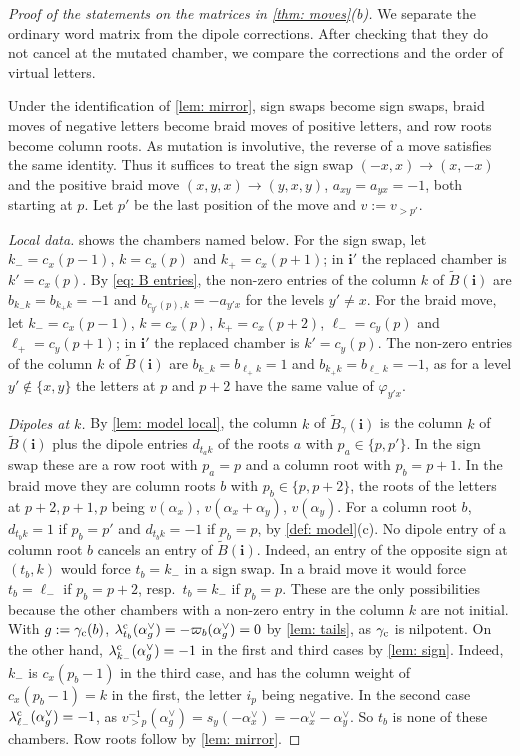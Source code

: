 \documentclass[a4paper]{amsart}
\numberwithin{equation}{section}
\theoremstyle{definition}
\theoremstyle{remark}
\newcommand{\bfi}{\mathbf{i}}
\newcommand{\tB}{\widetilde{B}}
\newcommand{\cc}{{\rm c}}
\begin{document}
\begin{proof}[Proof of the statements on the matrices in \cref{thm: moves}(b)]
We separate the ordinary word matrix from the dipole corrections.
After checking that they do not cancel at the mutated chamber, we compare the corrections and the order of virtual letters.

  Under the identification of \cref{lem: mirror}, sign swaps become sign swaps, braid moves of negative letters become braid moves of positive letters, and row roots become column roots.
  As mutation is involutive, the reverse of a move satisfies the same identity.
  Thus it suffices to treat the sign swap $(-x,x)\to(x,-x)$ and the positive braid move $(x,y,x)\to(y,x,y)$, $a_{xy}=a_{yx}=-1$, both starting at $p$.
  Let $p'$ be the last position of the move and $v:=v_{>p'}$.

  \emph{Local data.}
   shows the chambers named below.
  For the sign swap, let $k_-=c_x(p-1)$, $k=c_x(p)$ and $k_+=c_x(p+1)$; in $\bfi'$ the replaced chamber is $k'=c_x(p)$.
  By \eqref{eq: B entries}, the non-zero entries of the column $k$ of $\tB(\bfi)$ are $b_{k_-k}=b_{k_+k}=-1$ and $b_{c_{y'}(p),k}=-a_{y'x}$ for the levels $y'\neq x$.
  For the braid move, let $k_-=c_x(p-1)$, $k=c_x(p)$, $k_+=c_x(p+2)$, $\ell_-=c_y(p)$ and $\ell_+=c_y(p+1)$; in $\bfi'$ the replaced chamber is $k'=c_y(p)$.
  The non-zero entries of the column $k$ of $\tB(\bfi)$ are $b_{k_-k}=b_{\ell_+k}=1$ and $b_{k_+k}=b_{\ell_-k}=-1$, as for a level $y'\notin\{x,y\}$ the letters at $p$ and $p+2$ have the same value of $\varphi_{y'x}$.

  \emph{Dipoles at $k$.}
  By \cref{lem: model local}, the column $k$ of $\tB_\gamma(\bfi)$ is the column $k$ of $\tB(\bfi)$ plus the dipole entries $d_{t_ak}$ of the roots $a$ with $p_a\in\{p,p'\}$.
  In the sign swap these are a row root with $p_a=p$ and a column root with $p_b=p+1$.
  In the braid move they are column roots $b$ with $p_b\in\{p,p+2\}$, the roots of the letters at $p+2,p+1,p$ being $v(\alpha_x)$, $v(\alpha_x+\alpha_y)$, $v(\alpha_y)$.
  For a column root $b$, $d_{t_bk}=1$ if $p_b=p'$ and $d_{t_bk}=-1$ if $p_b=p$, by \cref{def: model}(c).
  No dipole entry of a column root $b$ cancels an entry of $\tB(\bfi)$.
  Indeed, an entry of the opposite sign at $(t_b,k)$ would force $t_b=k_-$ in a sign swap.
  In a braid move it would force $t_b=\ell_-$ if $p_b=p+2$, resp.\ $t_b=k_-$ if $p_b=p$.
  These are the only possibilities because the other chambers with a non-zero entry in the column $k$ are not initial.
  With $g:=\gamma_{\cc}(b)$, $\lambda^\cc_{t_b}(\alpha_g^\vee)=-\varpi_b(\alpha_g^\vee)=0$ by \cref{lem: tails}, as $\gamma_{\cc}$ is nilpotent.
  On the other hand, $\lambda^\cc_{k_-}(\alpha_g^\vee)=-1$ in the first and third cases by \cref{lem: sign}.
  Indeed, $k_-$ is $c_x(p_b-1)$ in the third case, and has the column weight of $c_x(p_b-1)=k$ in the first, the letter $i_p$ being negative.
  In the second case $\lambda^\cc_{\ell_-}(\alpha_g^\vee)=-1$, as $v_{>p}^{-1}(\alpha_g^\vee)=s_y(-\alpha_x^\vee)=-\alpha_x^\vee-\alpha_y^\vee$.
  So $t_b$ is none of these chambers.
  Row roots follow by \cref{lem: mirror}.


\end{proof}
\end{document}
